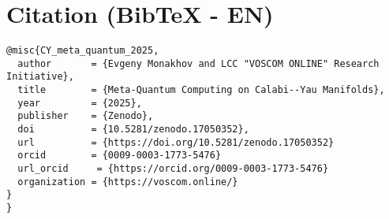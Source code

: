 \documentclass[12pt,a4paper]{article}
\begin{document}
\section*{Citation (BibTeX - EN)}
\begin{verbatim}
@misc{CY_meta_quantum_2025,
  author       = {Evgeny Monakhov and LCC "VOSCOM ONLINE" Research Initiative},
  title        = {Meta-Quantum Computing on Calabi--Yau Manifolds},
  year         = {2025},
  publisher    = {Zenodo},
  doi          = {10.5281/zenodo.17050352},
  url          = {https://doi.org/10.5281/zenodo.17050352}
  orcid		   = {0009-0003-1773-5476}
  url_orcid     = {https://orcid.org/0009-0003-1773-5476}
  organization = {https://voscom.online/}
}
}
\end{verbatim}
\end{document}
